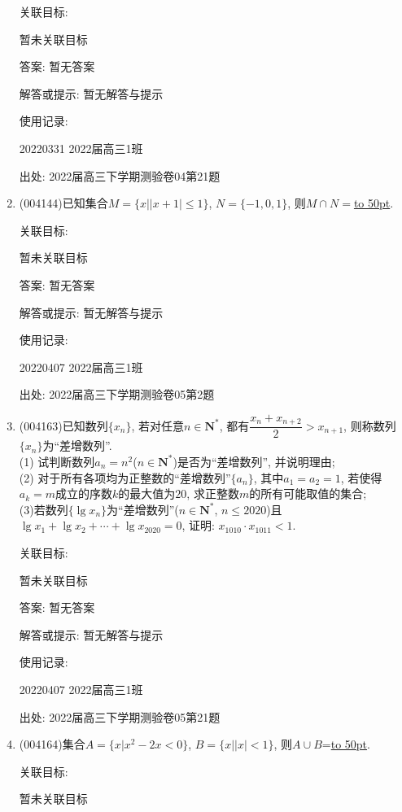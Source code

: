 \documentclass[10pt,a4paper]{article}
\newcommand{\blank}[1]{\underline{\hbox to #1pt{}}}
\begin{document}
\begin{enumerate}[1.]
关联目标:

暂未关联目标

答案: 暂无答案

解答或提示: 暂无解答与提示

使用记录:

20220331	2022届高三1班			


出处: 2022届高三下学期测验卷04第21题
\item { (004144)}已知集合$M=\{x||x+1|\le 1\}$, $N=\{-1,0,1\}$, 则$M\cap N=$\blank{50}.


关联目标:

暂未关联目标

答案: 暂无答案

解答或提示: 暂无解答与提示

使用记录:

20220407	2022届高三1班	


出处: 2022届高三下学期测验卷05第2题
\item { (004163)}已知数列$\{x_n\}$, 若对任意$n\in \mathbf{N}^*$, 都有$\dfrac{x_n+x_{n+2}}2>x_{n+1}$, 则称数列$\{x_n\}$为``差增数列''.\\
(1) 试判断数列$a_n=n^2$($n\in \mathbf{N}^*$)是否为``差增数列'', 并说明理由;\\
(2) 对于所有各项均为正整数的``差增数列''$\{a_n\}$, 其中$a_1=a_2=1$, 若使得$a_k=m$成立的序数$k$的最大值为$20$, 求正整数$m$的所有可能取值的集合;\\
(3)若数列$\{\lg x_n\}$为``差增数列''($n\in \mathbf{N}^*$, $n\le 2020$)且$\lg x_1+\lg x_2+\cdots +\lg x_{2020}=0$, 证明: $x_{1010}\cdot x_{1011}<1$.


关联目标:

暂未关联目标

答案: 暂无答案

解答或提示: 暂无解答与提示

使用记录:

20220407	2022届高三1班			


出处: 2022届高三下学期测验卷05第21题
\item { (004164)}集合$A=\{x|x^2-2x<0\}$, $B=\{x||x|<1\}$, 则$A\cup B$=\blank{50}.


关联目标:

暂未关联目标


\end{enumerate}
\end{document}
